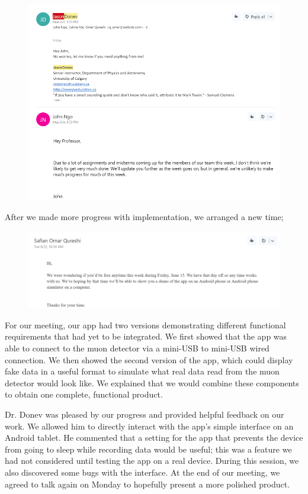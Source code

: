 \documentclass[11pt,a4paper]{article}
\begin{document}
\begin{figure}[h] \centering
	\includegraphics[width=1.1\textwidth]{email1.png}
\end{figure}

After we made more progress with implementation, we arranged a new time;

\begin{figure}[h] \centering
	\includegraphics[width=1.2\textwidth]{email2.png}
\end{figure}

For our meeting, our app had two versions demonstrating different functional requirements that had yet to be integrated. We first showed that the app was able to connect to the muon detector via a mini-USB to mini-USB wired connection. We then showed the second version of the app, which could display fake data in a useful format to simulate what real data read from the muon detector would look like. We explained that we would combine these components to obtain one complete, functional product.

Dr. Donev was pleased by our progress and provided helpful feedback on our work. We allowed him to directly interact with the app’s simple interface on an Android tablet. He commented that a setting for the app that prevents the device from going to sleep while recording data would be useful; this was a feature we had not considered until testing the app on a real device. During this session, we also discovered some bugs with the interface. At the end of our meeting, we agreed to talk again on Monday to hopefully present a more polished product. 
\end{document}

